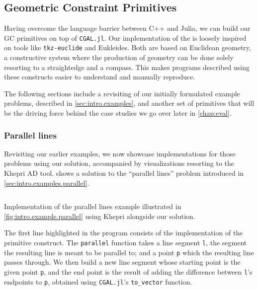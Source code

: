 \subsection{Geometric Constraint Primitives}%
\label{sec:solution.impl.gcps}

Having overcome the language barrier between C++ and Julia, we can build our
\ac{GC} primitives on top of \texttt{CGAL.jl}.  Our implementation of the
\primitives{} is loosely inspired on tools like \texttt{tkz-euclide} and
Eukleides.  Both are based on Euclidean geometry, a constructive system where
the production of geometry can be done solely resorting to a straightedge and a
compass.  This makes programs described using these constructs easier to
understand and manually reproduce.

The following sections include a revisiting of our initially formulated example 
problems, described in \cref{sec:intro.examples}, and another set of primitives
that will be the driving force behind the case studies we go over later in
\cref{chap:eval}.

\subsubsection{Parallel lines}%
\label{sec:solution.impl.gcps.parallel}

Revisiting our earlier examples, we now showcase implementations for those
problems using our solution, accompanied by visualizations resorting to the
Khepri \ac{AD} tool.   shows a solution to
the ``parallel lines'' problem introduced in \cref{sec:intro.examples.parallel}.

\begin{listing}[htbp]
  \inputminted[highlightlines={6,8-9,18}]{julia}{jl/ex_parallel.jl}
  \caption[Parallel lines example using our solution]{
    Implementation of the parallel lines example illustrated in
    \cref{fig:intro.example.parallel} using Khepri alongside our solution.}%
  \label{lst:solution.impl.gcps.parallel}
\end{listing}

The first line highlighted in the program consists of the implementation of the
primitive construct.  The \texttt{parallel} function takes a line segment
\texttt{l}, the segment the resulting line is meant to be parallel to; and a
point \texttt{p} which the resulting line passes through.  We then build a new
line segment whose starting point is the given point \texttt{p}, and the end
point is the result of adding the difference between \texttt{l}'s endpoints to
\texttt{p}, obtained using \texttt{CGAL.jl}'s \texttt{to\_vector} function.


